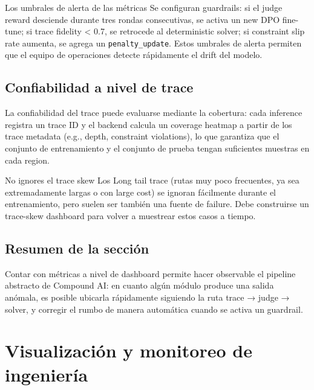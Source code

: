 \documentclass[a4paper]{article}
\begin{document}
\begin{knowledgebox}{Los umbrales de alerta de las métricas}
Se configuran guardrails: si el judge reward desciende durante tres rondas consecutivas, se activa un new DPO fine-tune; si trace fidelity < 0.7, se retrocede al deterministic solver; si constraint slip rate aumenta, se agrega un \texttt{penalty\_update}. Estos umbrales de alerta permiten que el equipo de operaciones detecte rápidamente el drift del modelo.
\end{knowledgebox}

\subsection{Confiabilidad a nivel de trace}

La confiabilidad del trace puede evaluarse mediante la cobertura: cada inference registra un trace ID y el backend calcula un coverage heatmap a partir de los trace metadata (e.g., depth, constraint violations), lo que garantiza que el conjunto de entrenamiento y el conjunto de prueba tengan suficientes muestras en cada region.

\begin{warningbox}{No ignores el trace skew}
Los Long tail trace (rutas muy poco frecuentes, ya sea extremadamente largas o con large cost) se ignoran fácilmente durante el entrenamiento, pero suelen ser también una fuente de failure. Debe construirse un trace-skew dashboard para volver a muestrear estos casos a tiempo.
\end{warningbox}

\subsection{Resumen de la sección}

Contar con métricas a nivel de dashboard permite hacer observable el pipeline abstracto de Compound AI: en cuanto algún módulo produce una salida anómala, es posible ubicarla rápidamente siguiendo la ruta trace → judge → solver, y corregir el rumbo de manera automática cuando se activa un guardrail.
\section{Visualización y monitoreo de ingeniería}
\end{document}
